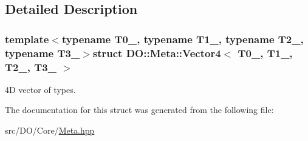\subsection{Detailed Description}
\subsubsection*{template$<$typename T0\-\_\-, typename T1\-\_\-, typename T2\-\_\-, typename T3\-\_\-$>$struct D\-O\-::\-Meta\-::\-Vector4$<$ T0\-\_\-, T1\-\_\-, T2\-\_\-, T3\-\_\- $>$}

4\-D vector of types. 

The documentation for this struct was generated from the following file\-:\begin{DoxyCompactItemize}
\item 
src/\-D\-O/\-Core/\hyperlink{_meta_8hpp}{Meta.\-hpp}\end{DoxyCompactItemize}
